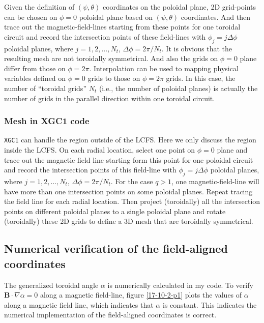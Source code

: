 \documentclass{article}
\newcommand{\code}[1]{\texttt{#1}}
\begin{document}
Given the definition of $(\psi, \theta)$ coordinates on the poloidal plane, 2D
grid-points can be chosen on $\phi = 0$ poloidal plane based on $(\psi,
\theta)$ coordinates. And then trace out the magnetic-field-lines starting
from these points for one toroidal circuit and record the intersection points
of these field-lines with $\phi_j = j \Delta \phi$ poloidal planes, where $j =
1, 2, \ldots, N_t$, $\Delta \phi = 2 \pi / N_t$. It is obvious that the
resulting mesh are not toroidally symmetrical. And also the grids on $\phi =
0$ plane differ from those on $\phi = 2 \pi$. Interpolation can be used to
mapping physical variables defined on $\phi = 0$ grids to those on $\phi = 2
\pi$ grids. In this case, the number of ``toroidal grids'' $N_t$ (i.e., the
number of poloidal planes) is actually the number of grids in the parallel
direction within one toroidal circuit.

\subsubsection{Mesh in XGC1 code}

{\code{XGC1}} can handle the region outside of the LCFS. Here we only discuss
the region inside the LCFS. On each radial location, select one point on $\phi
= 0$ plane and trace out the magnetic field line starting form this point for
one poloidal circuit and record the intersection points of this field-line
with $\phi_j = j \Delta \phi$ poloidal planes, where $j = 1, 2, \ldots, N_t$,
$\Delta \phi = 2 \pi / N_t$. For the case $q > 1$, one magnetic-field-line
will have more than one intersection points on some poloidal planes. Repeat
tracing the field line for each radial location. Then project (toroidally) all
the intersection points on different poloidal planes to a single poloidal
plane and rotate (toroidally) these 2D grids to define a 3D mesh that are
toroidally symmetrical.

\subsection{Numerical verification of the field-aligned coordinates}

The generalized toroidal angle $\alpha$ is numerically calculated in my code.
To verify $\mathbf{B} \cdot \nabla \alpha = 0$ along a magnetic field-line,
figure \ref{17-10-2-p1} plots the values of $\alpha$ along a magnetic field
line, which indicates that $\alpha$ is constant. This indicates the numerical
implementation of the field-aligned coordinates is correct.
\end{document}
